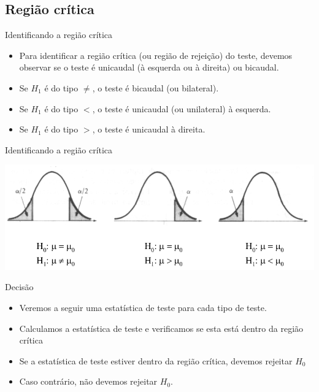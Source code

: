 \documentclass{beamer}
\begin{document}
\subsection{Região crítica}

\begin{frame}{Identificando a região crítica}
  \begin{itemize}
  \item Para identificar a região crítica (ou região de rejeição) do
    teste, devemos observar se o teste é unicaudal (à esquerda ou à
    direita) ou bicaudal.
  \item Se $H_1$ é do tipo $\ne$, o teste é bicaudal (ou bilateral).
  \item Se $H_1$ é do tipo $<$, o teste é unicaudal (ou unilateral) à esquerda.
  \item Se $H_1$ é do tipo $>$, o teste é unicaudal à direita.
  \end{itemize}
\end{frame}

\begin{frame}{Identificando a região crítica}
  \begin{center}
    \includegraphics[width=\textwidth]{TH_I/regiao_critica2}
  \end{center}
\end{frame}

\begin{frame}{Decisão}
  \begin{itemize}
  \item Veremos a seguir uma estatística de teste para cada tipo de teste.
  \item Calculamos a estatística de teste e verificamos se esta está
    dentro da região crítica
  \item Se a estatística de teste estiver dentro da região crítica,
    devemos rejeitar $H_0$
  \item Caso contrário, não devemos rejeitar $H_0$.
  \end{itemize}
\end{frame}
\end{document}
